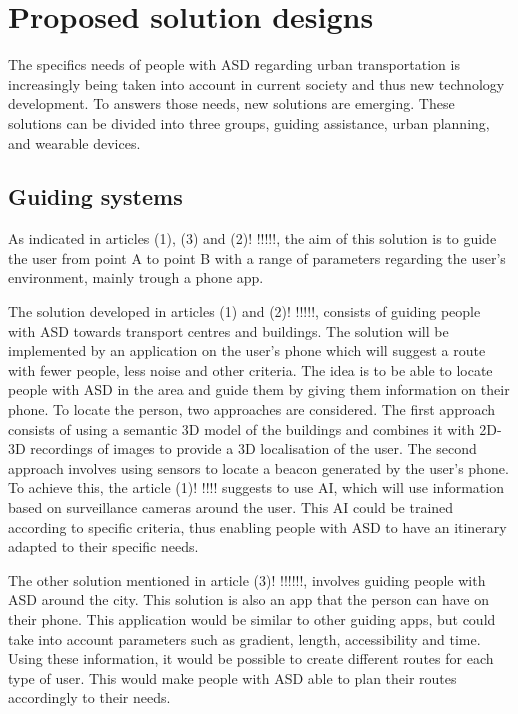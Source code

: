 \section{Proposed solution designs}

The specifics needs of people with ASD regarding urban transportation is increasingly being taken into account in current society and thus new technology development. To answers those needs, new solutions are emerging. These solutions can be divided into three groups, guiding assistance, urban planning, and wearable devices.

\subsection{Guiding systems}

As indicated in articles (1), (3) and (2)! !!!!!, the aim of this solution is to guide the user from point A to point B with a range of parameters regarding the user's environment, mainly trough a phone app. 


The solution developed in articles (1) and (2)! !!!!!, consists of guiding people with ASD towards transport centres and buildings. The solution will be implemented by an application on the user's phone which will suggest a route with fewer people, less noise and other criteria. The idea is to be able to locate people with ASD in the area and guide them by giving them information on their phone.
To locate the person, two approaches are considered. The first approach consists of using a semantic 3D model of the buildings and combines it with 2D-3D recordings of images to provide a 3D localisation of the user. The second approach involves using sensors to locate a beacon generated by the user's phone. To achieve this, the article (1)! !!!! suggests to use AI, which will use information based on surveillance cameras around the user. This AI could be trained according to specific criteria, thus enabling people with ASD to have an itinerary adapted to their specific needs.



The other solution mentioned in article (3)! !!!!!!, involves guiding people with ASD around the city. This solution is also an app that the person can have on their phone. This application would be similar to other guiding apps, but could take into account parameters such as gradient, length, accessibility and time. Using these information, it would be possible to create different routes for each type of user. This would make people with ASD able to plan their routes accordingly to their needs.


